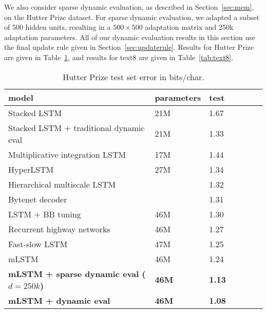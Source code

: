 \documentclass{article} \usepackage{iclr2018_conference,times}
\begin{document}
We also consider sparse dynamic evaluation, as described in Section~\ref{sec:mem}, on the Hutter Prize dataset. For sparse dynamic evaluation, we adapted a subset of $500$ hidden units, resulting in a $500\!\times\!500$ adaptation matrix and 250k adaptation parameters. All of our dynamic evaluation results in this section use the final update rule given in Section~\ref{sec:updaterule}. Results for Hutter Prize are given in Table~\ref{tab:hutter}, and results for text8 are given in Table~\ref{tab:text8}.
\begin{table}[tb]
\begin{center} 
\begin{tabular}{  l  l  l  l  l  l  l } \toprule 
model &  parameters & test \\ 
\midrule 
Stacked LSTM \citep{Graves-2013}  & 21M& 1.67 \\ 
Stacked LSTM + traditional dynamic eval \citep{Graves-2013} & 21M &1.33 \\ 
Multiplicative integration LSTM \citep{wu2016} &17M&1.44 \\  
HyperLSTM  \citep{Ha2017} & 27M&1.34\\   
Hierarchical multiscale LSTM \citep{chung2017} & & 1.32 \\  
Bytenet decoder \citep{Kalchbrenner2016}& & 1.31\\  
LSTM + BB tuning \citep{melis2017}& 46M & 1.30\\
Recurrent highway networks \citep{zilly2017} & 46M &1.27\\
Fast-slow LSTM \citep{mujika2017} & 47M & 1.25\\
\midrule 
mLSTM \citep{krause2016} & 46M & 1.24 \\
\textbf{mLSTM + sparse dynamic eval ($d=250k$)} & \textbf{46M} &\textbf{1.13}\\ 
\textbf{mLSTM + dynamic eval } & \textbf{46M} &\textbf{1.08}\\ 
\bottomrule
\end{tabular} 
\end{center}
\caption{Hutter Prize test set error in bits/char.}
\label{tab:hutter}
\end{table}
\end{document}
